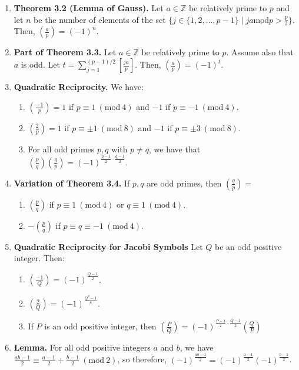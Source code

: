 \documentclass[11pt]{article}
\theoremstyle{definition}
\theoremstyle{named}
\newcommand{\Mod}[1]{\ (\mathrm{mod}\ #1)}
\begin{document}
\begin{enumerate}
    \item \textbf{Theorem 3.2 (Lemma of Gauss). } Let $a \in \mathbb{Z}$ be relatively prime to $p$ and let $n$ be the number of elements of the set $\{j \in \{1,2,\dots,p-1\} \mid ja \underline{\textrm{mod}} p > \frac{p}{2}\}$. Then, $\left(\frac{a}{p}\right) = (-1)^n$. 
    \item \textbf{Part of Theorem 3.3. } Let $a \in \mathbb{Z}$ be relatively prime to $p$. Assume also that $a$ is odd. Let $t = \sum_{j=1}^{(p-1)/2} \left[\frac{ja}{p}\right]$. Then, $\left(\frac{a}{p}\right) = (-1)^t$. 
    \item \textbf{Quadratic Reciprocity. } We have: 
    \begin{enumerate}
        \item $\left(\frac{-1}{p}\right) = 1$ if $p \equiv 1 \Mod{4}$ and $-1$ if $p \equiv -1 \Mod{4}$. 
        \item $\left(\frac{2}{p}\right) = 1$ if $p \equiv \pm 1 \Mod{8}$ and $-1$ if $p \equiv \pm 3 \Mod{8}$. 
        \item For all odd primes $p,q$ with $p \neq q$, we have that $\left(\frac{p}{q}\right)\left(\frac{q}{p}\right) = (-1)^{\frac{p-1}{2} \cdot \frac{q-1}{2}}$. 
    \end{enumerate}
    \item \textbf{Variation of Theorem 3.4. } If $p,q$ are odd primes, then $\left(\frac{q}{p}\right) = $
    \begin{enumerate}
        \item $\left(\frac{p}{q}\right)$ if $p \equiv 1 \Mod{4}$ or $q \equiv 1 \Mod{4}$. 
        \item $-\left(\frac{p}{q}\right)$ if $p \equiv q \equiv -1 \Mod{4}$. 
    \end{enumerate}
    \item \textbf{Quadratic Reciprocity for Jacobi Symbols} Let $Q$ be an odd positive integer. Then: 
    \begin{enumerate}
        \item $\left(\frac{-1}{Q}\right) = (-1)^{\frac{Q-1}{2}}$. 
        \item $\left(\frac{2}{Q}\right) = (-1)^{\frac{Q^2 - 1}{8}}$. 
        \item If $P$ is an odd positive integer, then $\left(\frac{P}{Q}\right) = (-1)^{\frac{P-1}{2} \cdot \frac{Q-1}{2}}\left(\frac{Q}{P}\right)$
    \end{enumerate}
    \item \textbf{Lemma. } For all odd positive integers $a$ and $b$, we have $\frac{ab-1}{2} \equiv \frac{a-1}{2} + \frac{b-1}{2} \Mod{2}$, so therefore, $(-1)^{\frac{ab-1}{2}} = (-1)^{\frac{a-1}{2}}(-1)^{\frac{b-1}{2}}$. 

\end{enumerate}
\end{document}
